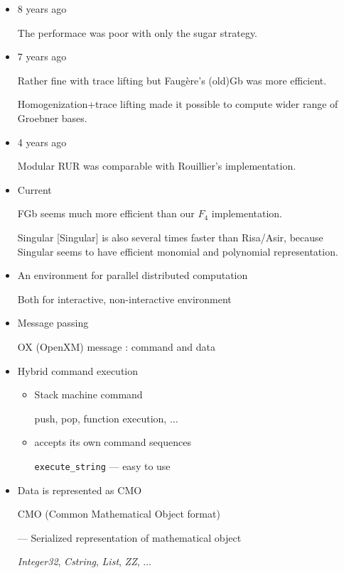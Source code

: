\begin{slide}{}

\begin{itemize}
\item 8 years ago

The performace was poor with only the sugar strategy.

\item 7 years ago

Rather fine with trace lifting but Faug\`ere's (old)Gb was more
efficient.  

Homogenization+trace lifting made it possible to compute
wider range of Groebner bases.

\item 4 years ago

Modular RUR was comparable with Rouillier's implementation.

\item Current

FGb seems much more efficient than our $F_4$ implementation.

Singular [Singular] is also several times
faster than Risa/Asir, because Singular seems to have efficient
monomial and polynomial representation.

\end{itemize}
\end{slide}

\begin{slide}{}

\begin{itemize}
\item An environment for parallel distributed computation

Both for interactive, non-interactive environment

\item Message passing

OX (OpenXM) message : command and data

\item Hybrid command execution

\begin{itemize}
\item Stack machine command

push, pop, function execution, $\ldots$

\item accepts its own command sequences

{\tt execute\_string} --- easy to use
\end{itemize}

\item Data is represented as CMO

CMO (Common Mathematical Object format)

--- Serialized representation of mathematical object

{\sl Integer32}, {\sl Cstring}, {\sl List}, {\sl ZZ}, $\ldots$
\end{itemize}
\end{slide}


